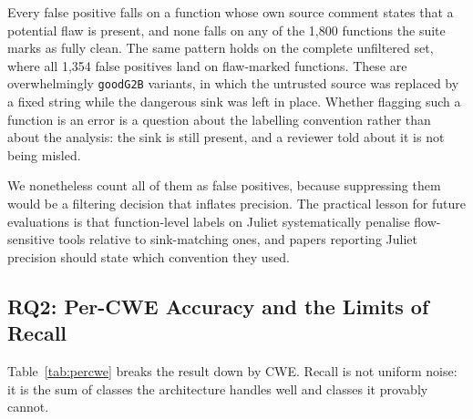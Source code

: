 \documentclass[10pt,conference]{IEEEtran}
\begin{document}
\begin{center}
\footnotesize
{}
\end{center}

Every false positive falls on a function whose own source comment states that
a potential flaw is present, and none falls on any of the 1{,}800 functions
the suite marks as fully clean. The same pattern holds on the complete
unfiltered set, where all 1{,}354 false positives land on flaw-marked
functions. These are overwhelmingly \texttt{goodG2B} variants, in which the
untrusted source was replaced by a fixed string while the dangerous sink was
left in place. Whether flagging such a function is an error is a question
about the labelling convention rather than about the analysis: the sink is
still present, and a reviewer told about it is not being misled.

We nonetheless count all of them as false positives, because suppressing them
would be a filtering decision that inflates precision. The practical lesson
for future evaluations is that function-level labels on Juliet systematically
penalise flow-sensitive tools relative to sink-matching ones, and papers
reporting Juliet precision should state which convention they used.

\subsection{RQ2: Per-CWE Accuracy and the Limits of Recall}
Table~\ref{tab:percwe} breaks the result down by CWE. Recall is not uniform
noise: it is the sum of classes the architecture handles well and classes it
provably cannot.
\end{document}
